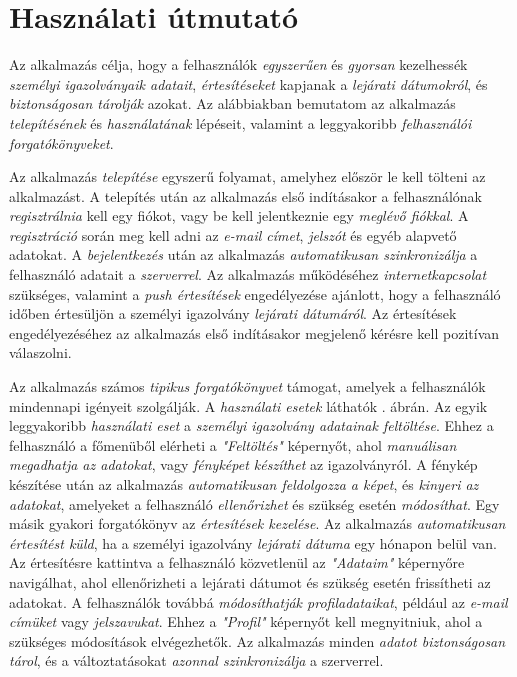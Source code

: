 \documentclass[
]{thesis-ekf}
\theoremstyle{definition}
\theoremstyle{remark}
\begin{document}
\section{Használati útmutató}

Az alkalmazás célja, hogy a felhasználók \emph{egyszerűen} és \emph{gyorsan} kezelhessék \emph{személyi igazolványaik adatait}, \emph{értesítéseket} kapjanak a \emph{lejárati dátumokról}, és \emph{biztonságosan tárolják} azokat. Az alábbiakban bemutatom az alkalmazás \emph{telepítésének} és \emph{használatának} lépéseit, valamint a leggyakoribb \emph{felhasználói forgatókönyveket}.

Az alkalmazás \emph{telepítése} egyszerű folyamat, amelyhez először le kell tölteni az alkalmazást. A telepítés után az alkalmazás első indításakor a felhasználónak \emph{regisztrálnia} kell egy fiókot, vagy be kell jelentkeznie egy \emph{meglévő fiókkal}. A \emph{regisztráció} során meg kell adni az \emph{e-mail címet}, \emph{jelszót} és egyéb alapvető adatokat. A \emph{bejelentkezés} után az alkalmazás \emph{automatikusan szinkronizálja} a felhasználó adatait a \emph{szerverrel}. Az alkalmazás működéséhez \emph{internetkapcsolat} szükséges, valamint a \emph{push értesítések} engedélyezése ajánlott, hogy a felhasználó időben értesüljön a személyi igazolvány \emph{lejárati dátumáról}. Az értesítések engedélyezéséhez az alkalmazás első indításakor megjelenő kérésre kell pozitívan válaszolni.

Az alkalmazás számos \emph{tipikus forgatókönyvet} támogat, amelyek a felhasználók mindennapi igényeit szolgálják. A \emph{használati esetek} láthatók . ábrán. Az egyik leggyakoribb \emph{használati eset} a \emph{személyi igazolvány adatainak feltöltése}. Ehhez a felhasználó a főmenüből elérheti a \emph{"Feltöltés"} képernyőt, ahol \emph{manuálisan megadhatja az adatokat}, vagy \emph{fényképet készíthet} az igazolványról. A fénykép készítése után az alkalmazás \emph{automatikusan feldolgozza a képet}, és \emph{kinyeri az adatokat}, amelyeket a felhasználó \emph{ellenőrizhet} és szükség esetén \emph{módosíthat}. Egy másik gyakori forgatókönyv az \emph{értesítések kezelése}. Az alkalmazás \emph{automatikusan értesítést küld}, ha a személyi igazolvány \emph{lejárati dátuma} egy hónapon belül van. Az értesítésre kattintva a felhasználó közvetlenül az \emph{"Adataim"} képernyőre navigálhat, ahol ellenőrizheti a lejárati dátumot és szükség esetén frissítheti az adatokat. A felhasználók továbbá \emph{módosíthatják profiladataikat}, például az \emph{e-mail címüket} vagy \emph{jelszavukat}. Ehhez a \emph{"Profil"} képernyőt kell megnyitniuk, ahol a szükséges módosítások elvégezhetők. Az alkalmazás minden \emph{adatot biztonságosan tárol}, és a változtatásokat \emph{azonnal szinkronizálja} a szerverrel.
\end{document}
